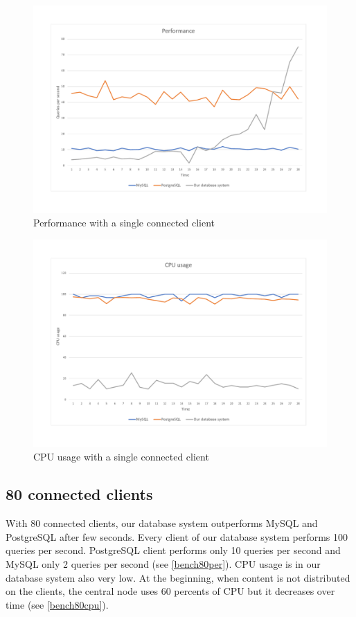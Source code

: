 \begin{figure}[H]
    \centering
    \includegraphics[width=.8\linewidth]{excel/20per.pdf}
    \caption{Performance with a single connected client}
    \label{bench20per}
\end{figure}


\begin{figure}[H]
    \centering
    \includegraphics[width=.8\linewidth]{excel/20cpu.pdf}
    \caption{CPU usage with a single connected client}
    \label{bench20cpu}
\end{figure}

\subsection{80 connected clients}
With 80 connected clients, our database system outperforms MySQL and PostgreSQL after few seconds. Every client of our database system performs 100 queries per second. PostgreSQL client performs only 10 queries per second and MySQL only 2 queries per second (see \ref{bench80per}). CPU usage is in our database system also very low. At the beginning, when content is not distributed on the clients, the central node uses 60 percents of CPU but it decreases over time (see \ref{bench80cpu}).

